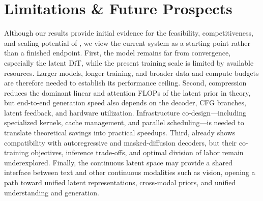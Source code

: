 \section{Limitations \& Future Prospects}
\label{sec:future-work}

Although our results provide initial evidence for the feasibility, competitiveness, and scaling potential of \method, we view the current system as a starting point rather than a finished endpoint. First, the model remains far from convergence, especially the latent DiT, while the present training scale is limited by available resources. Larger models, longer training, and broader data and compute budgets are therefore needed to establish its performance ceiling. Second, compression reduces the dominant linear and attention FLOPs of the latent prior in theory, but end-to-end generation speed also depends on the decoder, CFG branches, latent feedback, and hardware utilization. Infrastructure co-design---including specialized kernels, cache management, and parallel scheduling---is needed to translate theoretical savings into practical speedups. Third, \method already shows compatibility with autoregressive and masked-diffusion decoders, but their co-training objectives, inference trade-offs, and optimal division of labor remain underexplored. Finally, the continuous latent space may provide a shared interface between text and other continuous modalities such as vision, opening a path toward unified latent representations, cross-modal priors, and unified understanding and generation.
